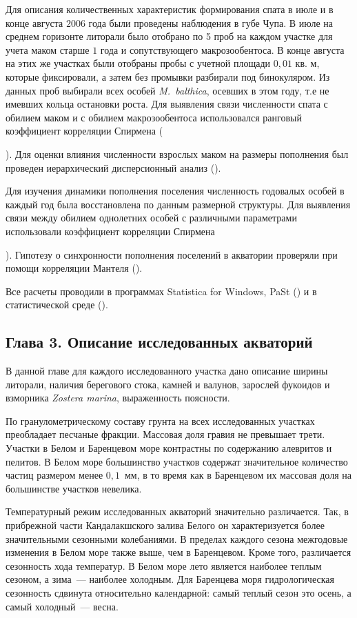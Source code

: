 Для описания количественных характеристик формирования спата в июле и в конце августа $2006$ года были проведены наблюдения в губе Чупа.
В июле на среднем горизонте литорали было отобрано по 5 проб на каждом участке для учета маком старше $1$ года и сопутствующего макрозообентоса. 
В конце августа на этих же участках были отобраны пробы с учетной площади $0,01$ кв. м, которые фиксировали, а затем без промывки разбирали под бинокуляром.  
Из данных проб выбирали всех особей \textit{M.~balthica}, осевших в этом году, т.е не имевших кольца остановки роста. 
Для выявления связи численности спата с обилием маком и с обилием макрозообентоса использовался ранговый коэффициент корреляции Спирмена ({\cite{Hollander_et_al_2013}).
Для оценки влияния численности взрослых маком на размеры пополнения был проведен иерархический дисперсионный анализ  (\cite{Chambers_Hastie_1991}).

Для изучения динамики пополнения поселения численность годовалых особей в каждый год была восстановлена по данным размерной структуры.
Для выявления связи между обилием однолетних особей с различными параметрами использовали коэффициент корреляции Спирмена {\cite{Hollander_et_al_2013}).
Гипотезу о синхронности пополнения поселений в акватории проверяли при помощи корреляции Мантеля (\cite{Legendre_Legendre_2012}).

Все расчеты проводили в программах Statistica for Windows,  PaSt (\cite{Hammer_et_al_2001}) и в статистической среде \R{} (\cite{R_2014}).

\subsection*{Глава 3. Описание исследованных акваторий}
В данной главе для каждого исследованного участка дано описание ширины литорали, наличия берегового стока, камней и валунов, зарослей фукоидов и взморника \textit{Zostera marina}, выраженность поясности.

По гранулометрическому составу грунта на всех исследованных участках преобладает песчаные фракции.
Массовая доля гравия не превышает трети.
Участки в Белом и Баренцевом море контрастны по содержанию алевритов и пелитов. 
В Белом море большинство участков содержат значительное количество частиц размером менее $0,1$~мм, в то время как в Баренцевом их массовая доля на большинстве участков невелика.

Температурный режим исследованных акваторий значительно различается.
Так, в прибрежной части Кандалакшского залива Белого он характеризуется более значительными сезонными колебаниями.
В пределах каждого сезона межгодовые изменения в Белом море также выше, чем в Баренцевом.
Кроме того, различается сезонность хода температур. 
В Белом море лето является наиболее теплым сезоном, а зима~--- наиболее холодным.
Для Баренцева моря гидрологическая сезонность сдвинута относительно календарной: самый теплый сезон это осень, а самый холодный~--- весна.



}}
